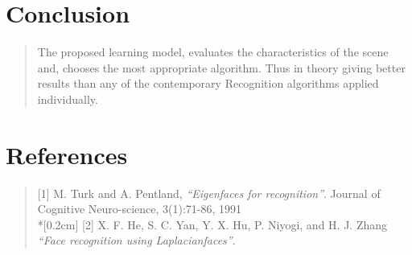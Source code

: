 \section*{Conclusion}
\begin{quote}
The proposed learning model, evaluates the characteristics of the scene and, chooses the most appropriate algorithm. Thus in theory giving better results than any of the contemporary Recognition algorithms applied individually.
\end{quote}

\section*{References}
\begin{quote}

{[1] M. Turk and A. Pentland,
  \emph{“Eigenfaces for recognition”}.
  Journal of Cognitive Neuro-science,
  3(1):71-86,
  1991}
  \\*[0.2cm]
{[2] X. F. He, S. C. Yan, Y. X. Hu, P. Niyogi, and H. J. Zhang
  \emph{“Face recognition using Laplacianfaces”}.}

\end{quote}
